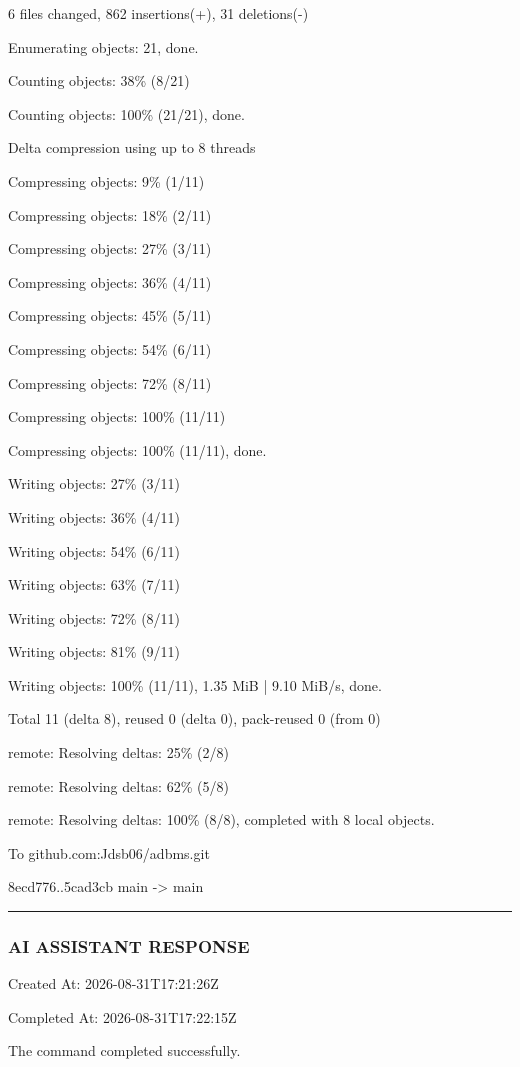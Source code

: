 \documentclass[11pt,a4paper]{article}
\begin{document}
6 files changed, 862 insertions(+), 31 deletions(-)

Enumerating objects: 21, done.

Counting objects:  38\% (8/21)

Counting objects: 100\% (21/21), done.

Delta compression using up to 8 threads

Compressing objects:   9\% (1/11)

Compressing objects:  18\% (2/11)

Compressing objects:  27\% (3/11)

Compressing objects:  36\% (4/11)

Compressing objects:  45\% (5/11)

Compressing objects:  54\% (6/11)

Compressing objects:  72\% (8/11)

Compressing objects: 100\% (11/11)

Compressing objects: 100\% (11/11), done.

Writing objects:  27\% (3/11)

Writing objects:  36\% (4/11)

Writing objects:  54\% (6/11)

Writing objects:  63\% (7/11)

Writing objects:  72\% (8/11)

Writing objects:  81\% (9/11)

Writing objects: 100\% (11/11), 1.35 MiB | 9.10 MiB/s, done.

Total 11 (delta 8), reused 0 (delta 0), pack-reused 0 (from 0)

remote: Resolving deltas:  25\% (2/8)

remote: Resolving deltas:  62\% (5/8)

remote: Resolving deltas: 100\% (8/8), completed with 8 local objects.

To github.com:Jdsb06/adbms.git

8ecd776..5cad3cb  main -> main


\hrule

\subsubsection{AI ASSISTANT RESPONSE}

Created At: 2026-08-31T17:21:26Z

Completed At: 2026-08-31T17:22:15Z


The command completed successfully.
\end{document}
